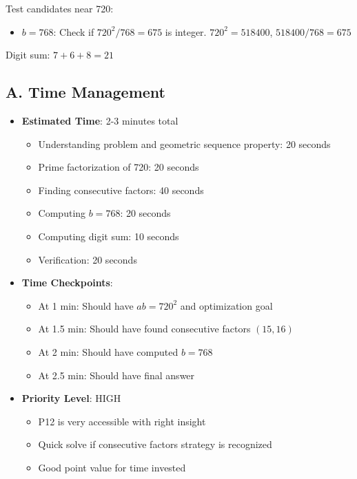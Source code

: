 \documentclass[11pt]{article}
\begin{document}
\begin{solutionbox}
Test candidates near 720:
\begin{itemize}
    \item $b = 768$: Check if $720^2 / 768 = 675$ is integer. $720^2 = 518400$, $518400 / 768 = 675$ \checkmark
\end{itemize}

Digit sum: $7 + 6 + 8 = 21$

\end{solutionbox}

\begin{competitionbox}
\subsection*{A. Time Management}
\begin{itemize}[leftmargin=*]
    \item \textbf{Estimated Time}: 2-3 minutes total
    \begin{itemize}
        \item Understanding problem and geometric sequence property: 20 seconds
        \item Prime factorization of 720: 20 seconds
        \item Finding consecutive factors: 40 seconds
        \item Computing $b = 768$: 20 seconds
        \item Computing digit sum: 10 seconds
        \item Verification: 20 seconds
    \end{itemize}
    
    \item \textbf{Time Checkpoints}: 
    \begin{itemize}
        \item At 1 min: Should have $ab = 720^2$ and optimization goal
        \item At 1.5 min: Should have found consecutive factors $(15, 16)$
        \item At 2 min: Should have computed $b = 768$
        \item At 2.5 min: Should have final answer
    \end{itemize}
    
    \item \textbf{Priority Level}: HIGH
    \begin{itemize}
        \item P12 is very accessible with right insight
        \item Quick solve if consecutive factors strategy is recognized
        \item Good point value for time invested
    \end{itemize}
\end{itemize}


\end{competitionbox}
\end{document}
